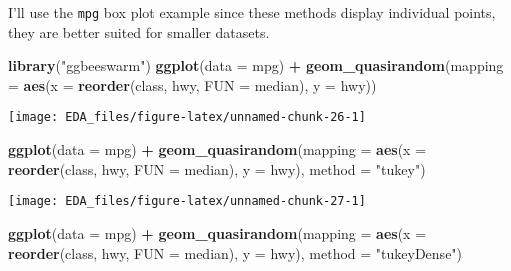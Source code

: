 \documentclass[]{book}
\newenvironment{Shaded}{\begin{snugshade}}{\end{snugshade}}
\newcommand{\DataTypeTok}[1]{\textcolor[rgb]{0.13,0.29,0.53}{#1}}
\newcommand{\KeywordTok}[1]{\textcolor[rgb]{0.13,0.29,0.53}{\textbf{#1}}}
\newcommand{\NormalTok}[1]{#1}
\newcommand{\OperatorTok}[1]{\textcolor[rgb]{0.81,0.36,0.00}{\textbf{#1}}}
\newcommand{\StringTok}[1]{\textcolor[rgb]{0.31,0.60,0.02}{#1}}
\theoremstyle{plain}
\theoremstyle{remark}
\theoremstyle{definition}
\theoremstyle{definition}
\theoremstyle{definition}
\theoremstyle{remark}
\begin{document}
I'll use the \texttt{mpg} box plot example since these methods display
individual points, they are better suited for smaller datasets.

\begin{Shaded}
\begin{Highlighting}[]
\KeywordTok{library}\NormalTok{(}\StringTok{"ggbeeswarm"}\NormalTok{)}
\KeywordTok{ggplot}\NormalTok{(}\DataTypeTok{data =}\NormalTok{ mpg) }\OperatorTok{+}
\StringTok{  }\KeywordTok{geom_quasirandom}\NormalTok{(}\DataTypeTok{mapping =} \KeywordTok{aes}\NormalTok{(}\DataTypeTok{x =} \KeywordTok{reorder}\NormalTok{(class, hwy, }\DataTypeTok{FUN =}\NormalTok{ median),}
                                 \DataTypeTok{y =}\NormalTok{ hwy))}
\end{Highlighting}
\end{Shaded}

\begin{center}\texttt{[image: EDA\_files/figure-latex/unnamed-chunk-26-1]} \end{center}

\begin{Shaded}
\begin{Highlighting}[]
\KeywordTok{ggplot}\NormalTok{(}\DataTypeTok{data =}\NormalTok{ mpg) }\OperatorTok{+}
\StringTok{  }\KeywordTok{geom_quasirandom}\NormalTok{(}\DataTypeTok{mapping =} \KeywordTok{aes}\NormalTok{(}\DataTypeTok{x =} \KeywordTok{reorder}\NormalTok{(class, hwy, }\DataTypeTok{FUN =}\NormalTok{ median),}
                                 \DataTypeTok{y =}\NormalTok{ hwy),}
                   \DataTypeTok{method =} \StringTok{"tukey"}\NormalTok{)}
\end{Highlighting}
\end{Shaded}

\begin{center}\texttt{[image: EDA\_files/figure-latex/unnamed-chunk-27-1]} \end{center}

\begin{Shaded}
\begin{Highlighting}[]
\KeywordTok{ggplot}\NormalTok{(}\DataTypeTok{data =}\NormalTok{ mpg) }\OperatorTok{+}
\StringTok{  }\KeywordTok{geom_quasirandom}\NormalTok{(}\DataTypeTok{mapping =} \KeywordTok{aes}\NormalTok{(}\DataTypeTok{x =} \KeywordTok{reorder}\NormalTok{(class, hwy, }\DataTypeTok{FUN =}\NormalTok{ median),}
                                 \DataTypeTok{y =}\NormalTok{ hwy),}
                   \DataTypeTok{method =} \StringTok{"tukeyDense"}\NormalTok{)}
\end{Highlighting}
\end{Shaded}
\end{document}
